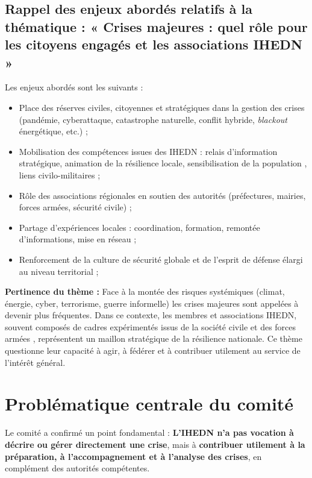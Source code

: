 \documentclass[12pt,a4paper]{article}
\begin{document}
\newpage

\subsection{Rappel des enjeux abordés relatifs à la thématique : « Crises majeures : quel rôle pour les citoyens engagés et les associations IHEDN »}

Les enjeux abordés sont les suivants :

\begin{itemize}
\item Place des réserves civiles, citoyennes et stratégiques dans la gestion des crises (pandémie, cyberattaque, catastrophe naturelle, conflit hybride, \textit{blackout} énergétique, etc.) ;
\item Mobilisation  des compétences issues des IHEDN : relais d'information stratégique, animation de la résilience locale, sensibilisation de la population , liens civilo-militaires ;
\item Rôle des associations régionales en soutien des autorités (préfectures, mairies, forces armées, sécurité civile) ;
\item Partage d'expériences locales : coordination, formation, remontée d'informations, mise en réseau  ;
\item Renforcement de la culture de sécurité globale et de l'esprit de défense élargi au niveau territorial ;
\end{itemize}

\textbf{Pertinence du thème :} Face à la montée des risques systémiques (climat, énergie, cyber, terrorisme, guerre informelle) les crises majeures sont appelées à devenir plus fréquentes. Dans ce contexte, les membres et associations IHEDN, souvent composés de cadres expérimentés issus de la société civile et des forces armées , représentent un maillon stratégique de la résilience nationale. Ce thème questionne leur capacité à agir, à fédérer et à contribuer utilement au service de l'intérêt général.

\newpage

\section{Problématique centrale du comité}

Le comité a confirmé un point fondamental : \textbf{L'IHEDN n'a pas vocation à décrire ou gérer directement une crise}, mais à \textbf{contribuer utilement à la préparation, à l'accompagnement et à l'analyse des crises}, en complément des autorités compétentes.
\end{document}
